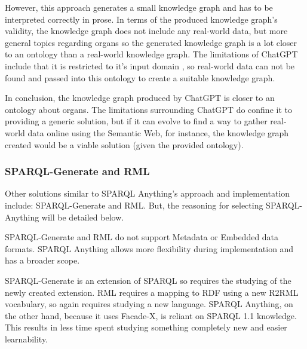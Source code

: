 However, this approach generates a small knowledge graph and has to be interpreted correctly in prose. In terms of the produced knowledge graph's validity, the knowledge graph does not include any real-world data, but more general topics regarding organs so the generated knowledge graph is a lot closer to an ontology than a real-world knowledge graph. The limitations of ChatGPT include that it is restricted to it's input domain \cite{chatgptwebsite}, so real-world data can not be found and passed into this ontology to create a suitable knowledge graph. 

In conclusion, the knowledge graph produced by ChatGPT is closer to an ontology about organs. The limitations surrounding ChatGPT do confine it to providing a generic solution, but if it can evolve to find a way to gather real-world data online using the Semantic Web, for instance, the knowledge graph created would be a viable solution (given the provided ontology).

\subsubsection{SPARQL-Generate and RML}
\hspace{0.5cm} Other solutions similar to SPARQL Anything's approach and implementation include: SPARQL-Generate and RML. But, the reasoning for selecting SPARQL-Anything will be detailed below.

SPARQL-Generate and RML do not support Metadata or Embedded data formats. \cite{sparqlanything} SPARQL Anything allows more flexibility during implementation and has a broader scope. 

SPARQL-Generate is an extension of SPARQL so requires the studying of the newly created extension. RML requires a mapping to RDF using a new R2RML vocabulary, so again requires studying a new language. SPARQL Anything, on the other hand, because it uses Facade-X, is reliant on SPARQL 1.1 knowledge. \cite{sparqlanything} This results in less time spent studying something completely new and easier learnability.

